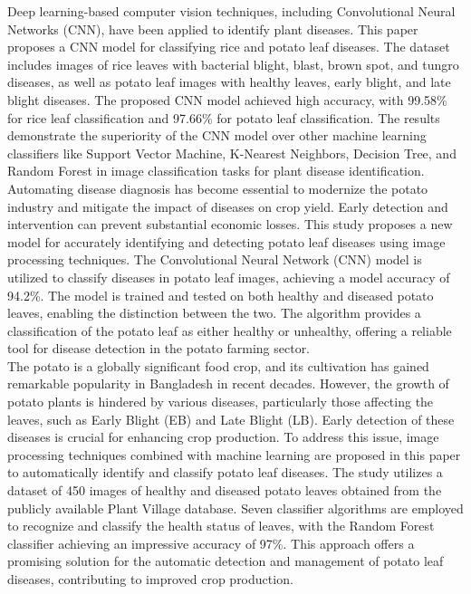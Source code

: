 \documentclass[conference]{IEEEtran}
\begin{document}
 Deep learning-based computer vision techniques, including Convolutional Neural Networks (CNN), have been applied to identify plant diseases. This paper \cite{sharma2022plant} proposes a CNN model for classifying rice and potato leaf diseases. The dataset includes images of rice leaves with bacterial blight, blast, brown spot, and tungro diseases, as well as potato leaf images with healthy leaves, early blight, and late blight diseases. The proposed CNN model achieved high accuracy, with 99.58\% for rice leaf classification and 97.66\% for potato leaf classification. The results demonstrate the superiority of the CNN model over other machine learning classifiers like Support Vector Machine, K-Nearest Neighbors, Decision Tree, and Random Forest in image classification tasks for plant disease identification.\\

Automating disease diagnosis has become essential to modernize the potato industry and mitigate the impact of diseases on crop yield. Early detection and intervention can prevent substantial economic losses. \cite{10080063} This study proposes a new model for accurately identifying and detecting potato leaf diseases using image processing techniques. The Convolutional Neural Network (CNN) model is utilized to classify diseases in potato leaf images, achieving a model accuracy of 94.2\%. The model is trained and tested on both healthy and diseased potato leaves, enabling the distinction between the two. The algorithm provides a classification of the potato leaf as either healthy or unhealthy, offering a reliable tool for disease detection in the potato farming sector.\\

The potato is a globally significant food crop, and its cultivation has gained remarkable popularity in Bangladesh in recent decades. However, the growth of potato plants is hindered by various diseases, particularly those affecting the leaves, such as Early Blight (EB) and Late Blight (LB). Early detection of these diseases is crucial for enhancing crop production. To address this issue, image processing techniques combined with machine learning are proposed in this paper \cite{9198563} to automatically identify and classify potato leaf diseases. The study utilizes a dataset of 450 images of healthy and diseased potato leaves obtained from the publicly available Plant Village database. Seven classifier algorithms are employed to recognize and classify the health status of leaves, with the Random Forest classifier achieving an impressive accuracy of 97\%. This approach offers a promising solution for the automatic detection and management of potato leaf diseases, contributing to improved crop production.\\
\end{document}
